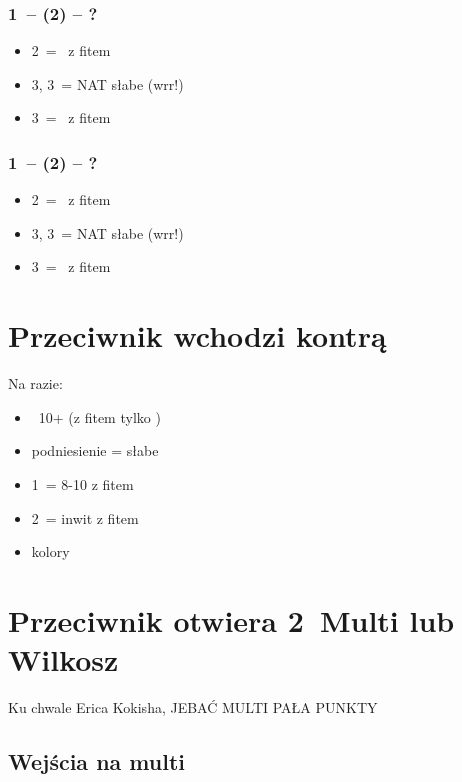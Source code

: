 \documentclass[12pt, a4paper]{article}
\begin{document}
\begin{minipage}{0.5\linewidth}
    \subsubsection*{1\hearts\ -- (2\hearts) -- ?}
    \begin{itemize}  
        \item 2\nt\ = \inv\ z fitem
        \item 3\clubs, 3\diams\ = NAT słabe (wrr!)
        \item 3\spades\ = \gf\ z fitem
    \end{itemize} 
\end{minipage}%
\begin{minipage}{0.5\linewidth}
    \subsubsection*{1\spades\ -- (2\spades) -- ?}
        \begin{itemize} 
            \item 2\nt\ = \gf\ z fitem
            \item 3\clubs, 3\diams\ = NAT słabe (wrr!)
            \item 3\hearts\ = \inv\ z fitem
        \end{itemize}
\end{minipage}

\pagebreak
\section{Przeciwnik wchodzi kontrą}
Na razie:
\begin{itemize}
    \item \rdbl\ 10+ (z fitem tylko \gf)
    \item podniesienie = słabe
    \item 1\nt\ = 8-10 z fitem
    \item 2\nt\ = inwit z fitem
    \item kolory \nf
\end{itemize}


\pagebreak
\section{Przeciwnik otwiera 2\diams\ Multi lub Wilkosz}
Ku chwale Erica Kokisha, JEBAĆ MULTI PAŁA PUNKTY
\subsection*{Wejścia na multi}
\end{document}
